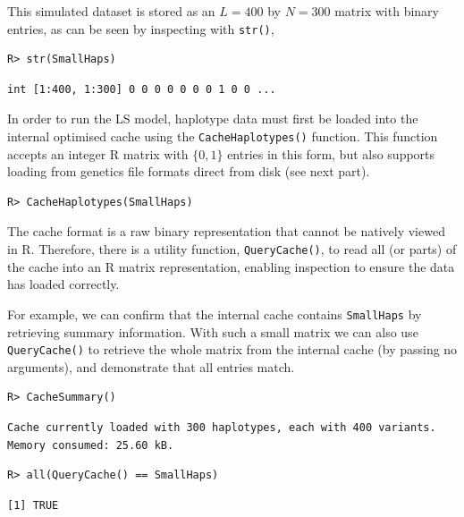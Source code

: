 \documentclass[a4paper]{article}
\let\proglang=\textsf
\begin{document}
This simulated dataset is stored as an \(L = 400\) by \(N = 300\) matrix with binary entries, as can be seen by inspecting with \texttt{str()},

\begin{verbatim}
R> str(SmallHaps)
\end{verbatim}
\begin{verbatim}
int [1:400, 1:300] 0 0 0 0 0 0 0 1 0 0 ...
\end{verbatim}

In order to run the LS model, haplotype data must first be loaded into the internal optimised cache using the \texttt{CacheHaplotypes()} function.
This function accepts an integer \proglang{R} matrix with $\{0,1\}$ entries in this form, but also supports loading from genetics file formats direct from disk (see next part).

\begin{verbatim}
R> CacheHaplotypes(SmallHaps)
\end{verbatim}

The cache format is a raw binary representation that cannot be natively viewed in \proglang{R}.
Therefore, there is a utility function, \texttt{QueryCache()}, to read all (or parts) of the cache into an \proglang{R} matrix representation, enabling inspection to ensure the data has loaded correctly.

For example, we can confirm that the internal cache contains \texttt{SmallHaps} by retrieving summary information.
With such a small matrix we can also use \texttt{QueryCache()} to retrieve the whole matrix from the internal cache (by passing no arguments), and demonstrate that all entries match.

\begin{verbatim}
R> CacheSummary()
\end{verbatim}
\begin{verbatim}
Cache currently loaded with 300 haplotypes, each with 400 variants.
Memory consumed: 25.60 kB.
\end{verbatim}
\begin{verbatim}
R> all(QueryCache() == SmallHaps)
\end{verbatim}
\begin{verbatim}
[1] TRUE
\end{verbatim}
\end{document}
